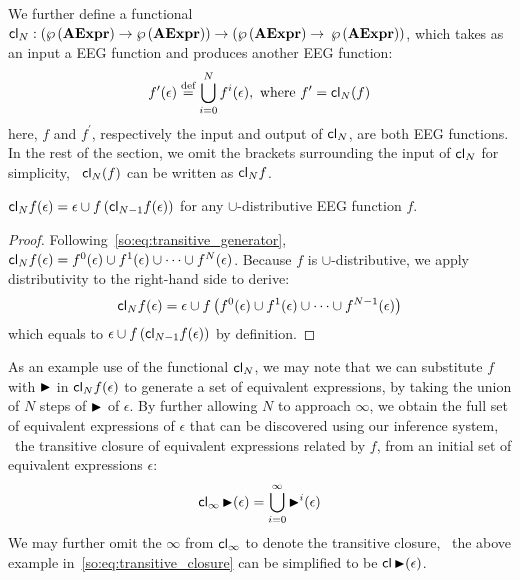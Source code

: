 \renewcommand{\closure}{\ensuremath\mathsf{cl}}

We further define a functional $\closure_N: ( \powersetof\aexprset \to
\powersetof\aexprset ) \to ( \powersetof\aexprset \to$ $\wp\left({\mathbf{AExpr}}\right)
)$, which takes as an input a EEG function and produces another EEG function:
\begin{equation}
    f^\prime (\epsilon) \stackrel{\text{def}}=
        \bigcup_{i = 0}^N f^i(\epsilon),
    \text{~where~} f^\prime = \closure_N (f)
    \label{so:eq:transitive_generator}
\end{equation}
here, $f$ and $f^\prime$, respectively the input and output of $\closure_N$,
are both EEG functions.  In the rest of the section, we omit the brackets
surrounding the input of $\closure_N$ for simplicity, \eg~$\closure_N (f)$ can
be written as $\closure_N f$.

\begin{lemma}
    $\closure_N f(\epsilon) = \epsilon \cup f \left( \closure_{N-1} f(\epsilon)
    \right)$ for any $\cup$-distributive EEG function $f$.
    {}\label{so:lem:transitive}
\end{lemma}
\begin{proof}
    Following~\eqref{so:eq:transitive_generator}, $\closure_N f(\epsilon) =
    f^0(\epsilon) \cup f^1(\epsilon) \cup \cdots \cup f^N(\epsilon)$.  Because
    $f$ is $\cup$-distributive, we apply distributivity to the right-hand side
    to derive:
    \begin{equation}
        \closure_N f(\epsilon) = \epsilon \cup f\left(
            f^0(\epsilon) \cup f^1(\epsilon) \cup \cdots \cup f^{N-1}(\epsilon)
        \right)
    \end{equation}
    which equals to $\epsilon \cup f\left( \closure_{N-1} f(\epsilon) \right)$
    by definition.
\end{proof}

As an example use of the functional $\closure_N$, we may note that we can
substitute $f$ with $\operatorname{\blacktriangleright}$ in $\closure_N f (\epsilon)$ to generate a set
of equivalent expressions, by taking the union of $N$ steps of $\operatorname{\blacktriangleright}$ of
$\epsilon$.  By further allowing $N$ to approach $\infty$, we obtain the full
set of equivalent expressions of $\epsilon$ that can be discovered using our
inference system, \ie~the transitive closure of equivalent expressions related
by $f$, from an initial set of equivalent expressions $\epsilon$:
\begin{equation}
    \closure_\infty \eqstep (\epsilon) =
        \bigcup_{i = 0}^\infty \eqstep^i(\epsilon)
    \label{so:eq:transitive_closure}
\end{equation}
We may further omit the $\infty$ from $\closure_\infty$ to denote the
transitive closure, \eg~the above example in~\ref{so:eq:transitive_closure} can
be simplified to be $\closure \eqstep (\epsilon)$.

